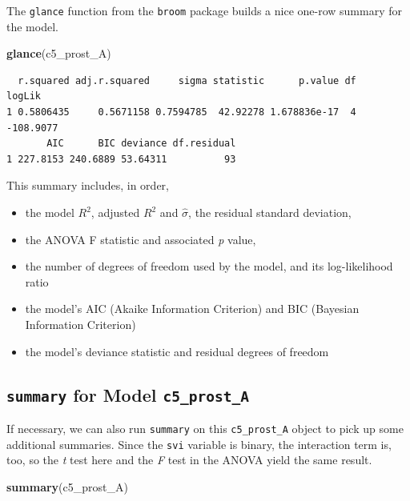 \documentclass[]{book}
\newenvironment{Shaded}{\begin{snugshade}}{\end{snugshade}}
\newcommand{\KeywordTok}[1]{\textcolor[rgb]{0.13,0.29,0.53}{\textbf{#1}}}
\newcommand{\NormalTok}[1]{#1}
\providecommand{\tightlist}{%
  \setlength{\itemsep}{0pt}\setlength{\parskip}{0pt}}
\theoremstyle{definition}
\theoremstyle{definition}
\theoremstyle{definition}
\theoremstyle{remark}
\begin{document}
The \texttt{glance} function from the \texttt{broom} package builds a
nice one-row summary for the model.

\begin{Shaded}
\begin{Highlighting}[]
\KeywordTok{glance}\NormalTok{(c5_prost_A)}
\end{Highlighting}
\end{Shaded}

\begin{verbatim}
  r.squared adj.r.squared     sigma statistic      p.value df    logLik
1 0.5806435     0.5671158 0.7594785  42.92278 1.678836e-17  4 -108.9077
       AIC      BIC deviance df.residual
1 227.8153 240.6889 53.64311          93
\end{verbatim}

This summary includes, in order,

\begin{itemize}
\tightlist
\item
  the model \(R^2\), adjusted \(R^2\) and \(\hat{\sigma}\), the residual
  standard deviation,
\item
  the ANOVA F statistic and associated \emph{p} value,
\item
  the number of degrees of freedom used by the model, and its
  log-likelihood ratio
\item
  the model's AIC (Akaike Information Criterion) and BIC (Bayesian
  Information Criterion)
\item
  the model's deviance statistic and residual degrees of freedom
\end{itemize}

\subsection{\texorpdfstring{\texttt{summary} for Model
\texttt{c5\_prost\_A}}{summary for Model c5\_prost\_A}}\label{summary-for-model-c5_prost_a}

If necessary, we can also run \texttt{summary} on this
\texttt{c5\_prost\_A} object to pick up some additional summaries. Since
the \texttt{svi} variable is binary, the interaction term is, too, so
the \emph{t} test here and the \emph{F} test in the ANOVA yield the same
result.

\begin{Shaded}
\begin{Highlighting}[]
\KeywordTok{summary}\NormalTok{(c5_prost_A)}
\end{Highlighting}
\end{Shaded}
\end{document}
